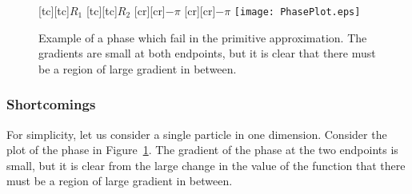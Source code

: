 \documentclass{article}
\begin{document}
\begin{figure}
\centering
{}[tc][tc]{$R_1$}
[tc][tc]{$R_2$}
[cr][cr]{$-\pi$}
[cr][cr]{$-\pi$}
\texttt{[image: PhasePlot.eps]}
\caption{Example of a phase which fail in the primitive
  approximation.  The gradients are small at both endpoints, but it is
  clear that there must be a region of large gradient in between.}
\label{fig:phaseplot}
\end{figure}

\subsubsection{Shortcomings}
For simplicity, let us consider a single particle in one dimension.
Consider the plot of the phase in Figure~\ref{fig:phaseplot}.  The
gradient of the phase at the two endpoints is small, but it is clear
from the large change in the value of the function that there must be
a region of large gradient in between.  
\end{document}
